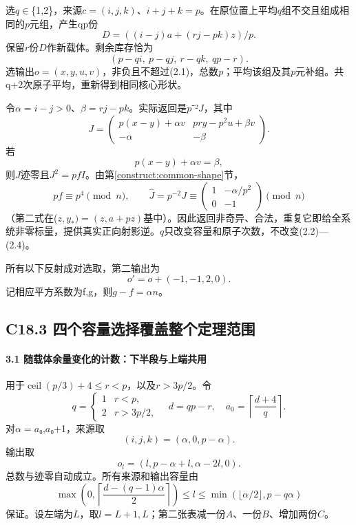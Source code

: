 {选\ensuremath{q}\ensuremath{\in}\{1,2\}，来源\ensuremath{c=(i,j,k)}、\ensuremath{i+j+k=p}。在原位置上平均\ensuremath{q}组不交且组成相同的\ensuremath{p}元组，产生qp份} \[
D=((i-j)a+(rj-pk)z)/p.
\] {保留\ensuremath{r}份\ensuremath{D}作新载体。剩余库存恰为} \[
(p-qi,\ p-qj,\ r-qk,\ qp-r).
\tag{C18.2.1}
\] {选输出\ensuremath{o=(x,y,u,v)}，非负且不超过(2.1)，总数\ensuremath{p}；平均该组及其\ensuremath{p}元补组。共q+2次原子平均，重新得到相同核心形状。}

{令\ensuremath{\alpha =i-j>0}、\ensuremath{\beta =rj-pk}。实际返回是\ensuremath{p}⁻²\ensuremath{J}，其中} \[
J=\begin{pmatrix}
p(x-y)+\alpha v&pry-p^2u+\beta v\\
-\alpha&-\beta
\end{pmatrix}.
\tag{C18.2.2}
\] {若} \[
p(x-y)+\alpha v=\beta,
\tag{C18.2.3}
\] {则\ensuremath{J}迹零且\ensuremath{J^{2}=pfI}。由}第\ref{construct:common-shape}节{，} \[
pf\equiv p^4\pmod n,
\qquad
\widehat J=p^{-2}J\equiv
\begin{pmatrix}1&-\alpha/p^2\\0&-1\end{pmatrix}\pmod n
\tag{C18.2.4}
\] {（第二式在(\ensuremath{z,y_*)=(z,a+pz)}基中）。因此返回非奇异、合法，重复它即给全系统非零标量，提供真实正向射影逆。\ensuremath{q}只改变容量和原子次数，不改变(2.2)---(2.4)。}

{所有以下反射成对选取，第二输出为} \[
o'=o+(-1,-1,2,0).
\] {记相应平方系数为f,g，则\ensuremath{g-f=\alpha n}。}

\subsection*{\texorpdfstring{{C18.3} {四个容量选择覆盖整个定理范围}}{C18.3 四个容量选择覆盖整个定理范围}}\label{C18-h131}

\paragraph*{\texorpdfstring{{3.1} {随载体余量变化的计数：下半段与上端共用}}{3.1 随载体余量变化的计数：下半段与上端共用}}\label{C18-h132}

{用于\ensuremath{\operatorname{ceil}(p/3)+4}\ensuremath{\le}\ensuremath{r<p}，以及\ensuremath{r>3p/2}。令} \[
q=\begin{cases}1&r<p,\\2&r>3p/2,\end{cases}
\quad d=qp-r,\quad
a_0=\left\lceil\frac{d+4}{q}\right\rceil.
\] {对\ensuremath{\alpha =a}₀,\ensuremath{a}₀+1，来源取} \[
\boxed{(i,j,k)=(\alpha,0,p-\alpha).}
\tag{C18.3.1}
\] {输出取} \[
\boxed{o_l=(l,p-\alpha+l,\alpha-2l,0).}
\tag{C18.3.2}
\] {总数与迹零自动成立。所有来源和输出容量由} \[
\boxed{
\max\left(0,\left\lceil\frac{d-(q-1)\alpha}{2}\right\rceil\right)
\le l\le
\min\left(\lfloor\alpha/2\rfloor,p-q\alpha\right)
}
\tag{C18.3.3}
\] {保证。设左端为\ensuremath{L}，取\ensuremath{l=L+1,L}；第二张表减一份\ensuremath{A}、一份\ensuremath{B}、增加两份\ensuremath{C}。}

